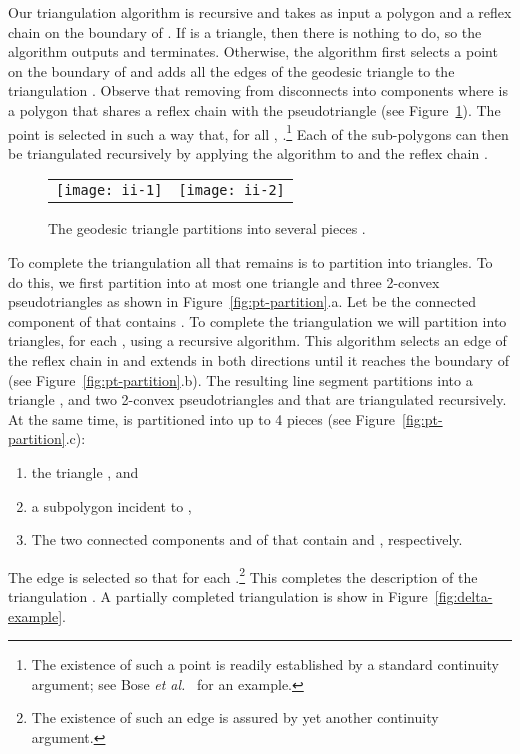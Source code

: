 \documentclass[lotsofwhite]{patmorin}
\newcommand{\figlabel}[1]{\label{fig:#1}}
\newcommand{\figref}[1]{\mbox{Figure~\ref{fig:#1}}}
\newcommand{\etal}{\emph{et al.}}
\begin{document}
Our triangulation algorithm is recursive and takes as input a polygon
 and a reflex chain  on the boundary of .  If
 is a triangle, then there is nothing to do, so the algorithm
outputs  and terminates. Otherwise, the
algorithm first selects a point  on the boundary of  and adds
all the edges of the geodesic triangle  to the
triangulation .
Observe that removing  from  disconnects  into
components  where  is a polygon that shares a
reflex chain  with the pseudotriangle  (see
\figref{ii}).  The point
 is selected in such a way that, for all , .\footnote{The existence of such a point  is
readily established by a standard continuity argument; see Bose \etal\
\cite{bdhlim07} for an example.} Each of the sub-polygons 
can then be triangulated recursively by applying the algorithm to
 and the reflex chain .

\begin{figure}
  \begin{center}
    \begin{tabular}{cc}
      \texttt{[image: ii-1]} & \texttt{[image: ii-2]} 
    \end{tabular}
  \end{center}
  \caption{The geodesic triangle  partitions  into several
pieces .}
  \figlabel{ii}
\end{figure}

To complete the triangulation  all that remains is to
partition  into triangles.  To
do this, we first partition  into at most one triangle  and
three
2-convex pseudotriangles  as shown in
\figref{pt-partition}.a. Let  be the connected component of
 that contains .  To
complete the triangulation we will partition  into triangles, for
each , using a recursive algorithm.  This algorithm
selects an edge  of the reflex chain in  and extends 
in both directions until it reaches the boundary of  (see
\figref{pt-partition}.b).  The resulting line segment partitions 
into a triangle , and two 2-convex pseudotriangles  and
 that are triangulated recursively.  At the same time, 
is partitioned into up to 4 pieces (see \figref{pt-partition}.c):

\begin{enumerate}
\item the triangle , and
\item a subpolygon  incident to ,
\item The two connected components 
and  of  that contain  and
, respectively.
\end{enumerate}
The edge  is selected
so that  for each
.\footnote{The existence of such an edge  is assured
by yet another continuity argument.}  This
completes the description of the triangulation .  A partially
completed triangulation is show in \figref{delta-example}.
\end{document}
